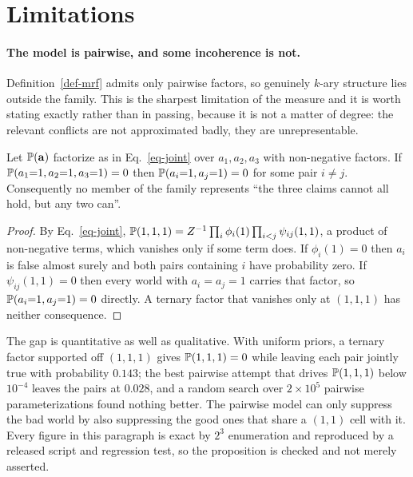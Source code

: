 \section{Limitations}
\label{sec-limitations}

\paragraph{The model is pairwise, and some incoherence is not.} Definition~\ref{def-mrf} admits only
pairwise factors, so genuinely $k$-ary structure lies outside the family. This is the sharpest
limitation of the measure and it is worth stating exactly rather than in passing, because it is not a
matter of degree: the relevant conflicts are not approximated badly, they are unrepresentable.

\begin{proposition}
\label{prop-kary}
Let $\mathbb{P}\!\left( \mathbf{a} \right)$ factorize as in Eq.~\ref{eq-joint} over $a_1,a_2,a_3$ with non-negative
factors. If $\mathbb{P}\!\left( a_1{=}1,a_2{=}1,a_3{=}1 \right)=0$ then $\mathbb{P}\!\left( a_i{=}1,a_j{=}1 \right)=0$ for some pair $i\neq j$.
Consequently no member of the family represents ``the three claims cannot all hold, but any two
can''.
\end{proposition}

\begin{proof}
By Eq.~\ref{eq-joint}, $\mathbb{P}\!\left( 1,1,1 \right)=Z^{-1}\prod_i\phi_i(1)\prod_{i<j}\psi_{ij}(1,1)$, a product of
non-negative terms, which vanishes only if some term does. If $\phi_i(1)=0$ then $a_i$ is false
almost surely and both pairs containing $i$ have probability zero. If $\psi_{ij}(1,1)=0$ then every
world with $a_i=a_j=1$ carries that factor, so $\mathbb{P}\!\left( a_i{=}1,a_j{=}1 \right)=0$ directly. A ternary factor
that vanishes only at $(1,1,1)$ has neither consequence.
\end{proof}

The gap is quantitative as well as qualitative. With uniform priors, a ternary factor supported off
$(1,1,1)$ gives $\mathbb{P}\!\left( 1,1,1 \right)=0$ while leaving each pair jointly true with probability $0.143$; the
best pairwise attempt that drives $\mathbb{P}\!\left( 1,1,1 \right)$ below $10^{-4}$ leaves the pairs at $0.028$, and a
random search over $2\times10^{5}$ pairwise parameterizations found nothing better. The pairwise model
can only suppress the bad world by also suppressing the good ones that share a $(1,1)$ cell with it.
Every figure in this paragraph is exact by $2^3$ enumeration and reproduced by a released script and
regression test, so the proposition is checked and not merely asserted.


